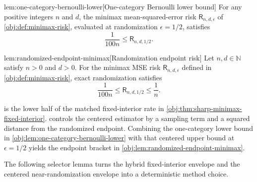 \begin{lemmav}{lem:one-category-bernoulli-lower}[One-category Bernoulli lower bound]
For any positive integers \(n\) and \(d\), the minimax mean-squared-error risk \(\mathsf R_{n,d,\epsilon}\) of \cref{obj:def:minimax-risk}, evaluated at randomization \(\epsilon=1/2\), satisfies
\[
\frac{1}{100n}\le \mathsf R_{n,d,1/2}.
\]
\end{lemmav}

\begin{lemmav}{lem:randomized-endpoint-minimax}[Randomization endpoint risk]
Let \(n,d\in\mathbb N\) satisfy \(n>0\) and \(d>0\). For the minimax MSE risk \(\mathsf R_{n,d,\epsilon}\) defined in \cref{obj:def:minimax-risk}, exact randomization satisfies
\[
\frac{1}{100n}\le \mathsf R_{n,d,1/2}\le \frac{1}{n}.
\]
\end{lemmav}

 is the lower half of the matched fixed-interior rate in \cref{obj:thm:sharp-minimax-fixed-interior}.  controls the centered estimator by a sampling term and a squared distance from the randomized endpoint. Combining the one-category lower bound in \cref{obj:lem:one-category-bernoulli-lower} with that centered upper bound at \(\epsilon=1/2\) yields the endpoint bracket in \cref{obj:lem:randomized-endpoint-minimax}.

The following selector lemma turns the hybrid fixed-interior envelope and the centered near-randomization envelope into a deterministic method choice.

